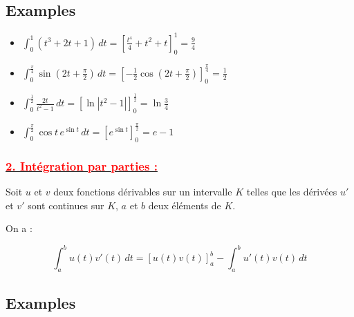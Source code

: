 \documentclass[12pt,a4paper]{article}
\begin{document}
\subsection*{Examples}

\begin{itemize}
    \item \( \int_0^1 \left( t^3 + 2t + 1 \right) \, dt = \left[ \frac{t^4}{4} + t^2 + t \right]_0^1 = \frac{9}{4} \)
    
    \item \( \int_0^{\frac{\pi}{4}} \sin \left( 2t + \frac{\pi}{2} \right) \, dt = \left[ -\frac{1}{2} \cos \left( 2t + \frac{\pi}{2} \right) \right]_0^{\frac{\pi}{4}} = \frac{1}{2} \)
    
    \item \( \int_0^{\frac{1}{2}} \frac{2t}{t^2 - 1} \, dt = \left[ \ln |t^2 - 1| \right]_0^{\frac{1}{2}} = \ln \frac{3}{4} \)
    
    \item \( \int_0^{\frac{\pi}{2}} \cos t \, e^{\sin t} \, dt = \left[ e^{\sin t} \right]_0^{\frac{\pi}{2}} = e - 1 \)
\end{itemize}

\subsubsection*{\underline{\textcolor{red}{2. Intégration par parties :}}}
Soit \( u \) et \( v \) deux fonctions dérivables sur un intervalle \( K \) telles que les dérivées \( u' \) et \( v' \) sont continues sur \( K \), \( a \) et \( b \) deux éléments de \( K \).

On a :

\[
\int_a^b u(t) v'(t) \, dt = \left[ u(t) v(t) \right]_a^b - \int_a^b u'(t) v(t) \, dt
\]

\subsection*{Examples}
\end{document}
